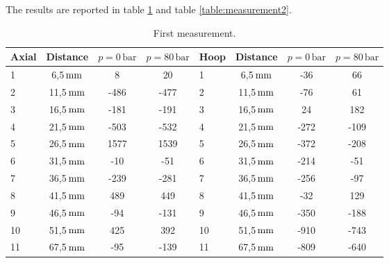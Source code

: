 \documentclass[a4paper,12pt]{article}
\begin{document}
The results are reported in table \ref{table:measurement1} and table \ref{table:measurement2}.

\begin{table}[H]
\centering
\begin{tabular}{lccc|lccc}
Axial & Distance  & $p = 0\,\text{bar}$ & $p = 80\,\text{bar}$ & Hoop & Distance  & $p = 0\,\text{bar}$ & $p = 80\,\text{bar}$ \\ \midrule
1     & 6,5$\,\text{mm}$  & 8                   & 20                    & 1    & 6,5$\,\text{mm}$  & -36                 & 66                   \\ 
2     & 11,5$\,\text{mm}$ & -486                & -477                 & 2    & 11,5$\,\text{mm}$ & -76                 & 61                   \\
3     & 16,5$\,\text{mm}$ & -181                & -191                 & 3    & 16,5$\,\text{mm}$ & 24                  & 182                  \\
4     & 21,5$\,\text{mm}$ & -503                & -532                 & 4    & 21,5$\,\text{mm}$ & -272                & -109                 \\
5     & 26,5$\,\text{mm}$ & 1577                & 1539                 & 5    & 26,5$\,\text{mm}$ & -372                & -208                 \\
6     & 31,5$\,\text{mm}$ & -10                 & -51                  & 6    & 31,5$\,\text{mm}$ & -214                & -51                  \\
7     & 36,5$\,\text{mm}$ & -239                & -281                 & 7    & 36,5$\,\text{mm}$ & -256                & -97                  \\
8     & 41,5$\,\text{mm}$ & 489                 & 449                  & 8    & 41,5$\,\text{mm}$ & -32                 & 129                  \\
9     & 46,5$\,\text{mm}$ & -94                 & -131                 & 9    & 46,5$\,\text{mm}$ & -350                & -188                 \\
10    & 51,5$\,\text{mm}$ & 425                 & 392                  & 10   & 51,5$\,\text{mm}$ & -910                & -743                 \\
11    & 67,5$\,\text{mm}$ & -95                 & -139                 & 11   & 67,5$\,\text{mm}$ & -809                & -640                 \\ \bottomrule
\end{tabular}
\caption{First measurement.}
\label{table:measurement1}
\end{table}
%
\end{document}
